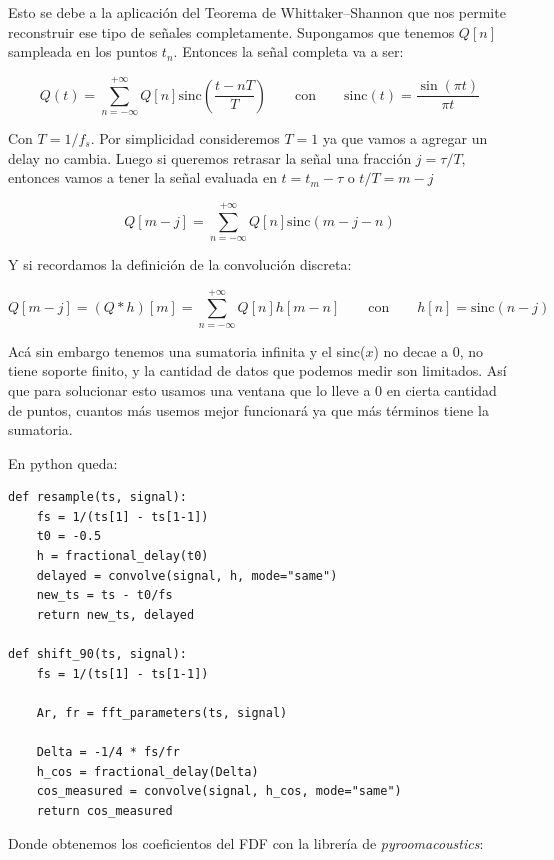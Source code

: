 Esto se debe a la aplicación del Teorema de Whittaker–Shannon que nos permite reconstruir ese tipo de señales completamente. Supongamos que tenemos $Q[n]$ sampleada en los puntos $t_n$. Entonces la señal completa va a ser:

\begin{equation}
	Q(t) = \sum_{n=-\infty}^{+\infty} Q[n]\text{sinc}\left(\frac{t-nT}{T}\right) \qquad \text{con} \qquad \text{sinc}(t) = \frac{\sin(\pi t)}{\pi t}
\end{equation}

Con $T=1/f_s$. Por simplicidad consideremos $T=1$ ya que vamos a agregar un delay no cambia. Luego si queremos retrasar la señal una fracción $j=\tau/T$, entonces vamos a tener la señal evaluada en $t=t_m-\tau$ o $t/T=m-j$

\begin{equation}
	Q[m-j] = \sum_{n=-\infty}^{+\infty}Q[n]\text{sinc}(m-j-n)
\end{equation} 

Y si recordamos la definición de la convolución discreta:

\begin{equation}
	Q[m-j]=(Q*h)[m] = \sum_{n=-\infty}^{+\infty}Q[n]h[m-n] \qquad \text{con} \qquad h[n]=\text{sinc}(n-j)
\end{equation}

Acá sin embargo tenemos una sumatoria infinita y el sinc($x$) no decae a 0, no tiene soporte finito, y la cantidad de datos que podemos medir son limitados. Así que para solucionar esto usamos una ventana que lo lleve a 0 en cierta cantidad de puntos, cuantos más usemos mejor funcionará ya que más términos tiene la sumatoria. 

En python queda:

\begin{lstlisting}
def resample(ts, signal):
	fs = 1/(ts[1] - ts[1-1])
	t0 = -0.5
	h = fractional_delay(t0)
	delayed = convolve(signal, h, mode="same")
	new_ts = ts - t0/fs
	return new_ts, delayed
	
def shift_90(ts, signal):
	fs = 1/(ts[1] - ts[1-1])
	
	Ar, fr = fft_parameters(ts, signal)
	
 	Delta = -1/4 * fs/fr 
	h_cos = fractional_delay(Delta)
	cos_measured = convolve(signal, h_cos, mode="same")
	return cos_measured
\end{lstlisting}


Donde obtenemos los coeficientos del FDF con la librería de \textit{pyroomacoustics}:

